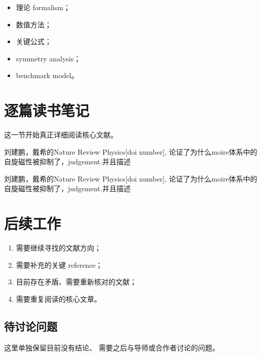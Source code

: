 \documentclass[11pt, oneside]{article}
\begin{document}
\begin{itemize}
	\item 理论 formalism；
	\item 数值方法；
	\item 关键公式；
	\item symmetry analysis；
	\item benchmark model。
\end{itemize}


\section{逐篇读书笔记}

这一节开始真正详细阅读核心文献。



\noindent

{\kaishu 刘建鹏，戴希的Nature Review Physics[doi number], 论证了为什么moire体系中的自旋磁性被抑制了}，judgement.并且描述
\\
\noindent

{\kaishu 刘建鹏，戴希的Nature Review Physics[doi number], 论证了为什么moire体系中的自旋磁性被抑制了}，judgement.并且描述


\section{后续工作}

\begin{enumerate}
	\item 需要继续寻找的文献方向；
	\item 需要补充的关键 reference；
	\item 目前存在矛盾、需要重新核对的文献；
	\item 需要重复阅读的核心文章。
\end{enumerate}


\subsection{待讨论问题}

这里单独保留目前没有结论、
需要之后与导师或合作者讨论的问题。
\end{document}
